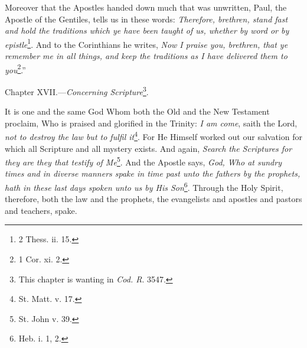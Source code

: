 Moreover that the Apostles handed down much that was unwritten, Paul, the Apostle of the Gentiles, tells us in these words: \emph{Therefore, brethren, stand fast and hold the traditions which ye have been taught of us, whether by word or by epistle}\footnote{2 Thess. ii. 15.}. And to the Corinthians he writes, \emph{Now I praise you, brethren, that ye remember me in all things, and keep the traditions as I have delivered them to you}\footnote{1 Cor. xi. 2.}.”


Chapter XVII.—\emph{Concerning Scripture}\footnote{This chapter is wanting in \emph{Cod. R}. 3547.}.

It is one and the same God Whom both the Old and the New Testament proclaim, Who is praised and glorified in the Trinity: \emph{I am come}, saith the Lord, \emph{not to destroy the law but to fulfil it}\footnote{St. Matt. v. 17.}. For He Himself worked out our salvation for which all Scripture and all mystery exists. And again, \emph{Search the Scriptures for they are they that testify of Me}\footnote{St. John v. 39.}. And the Apostle says, \emph{God, Who at sundry times and in diverse manners spake in time past unto the fathers by the prophets, hath in these last days spoken unto us by His Son}\footnote{Heb. i. 1, 2.}. Through the Holy Spirit, therefore, both the law and the prophets, the evangelists and apostles and pastors and teachers, spake.

